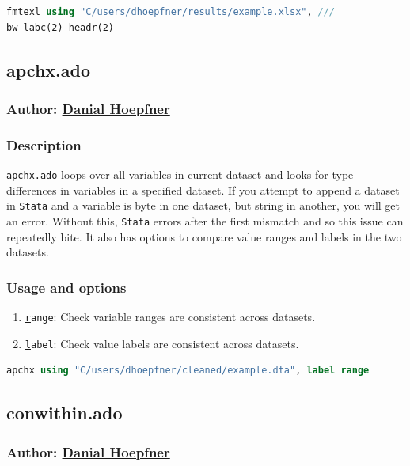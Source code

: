 {\begin{lstlisting}[language=Stata, numbers=none]
fmtexl using "C/users/dhoepfner/results/example.xlsx", ///
bw labc(2) headr(2)
\end{lstlisting}

\subsection{apchx.ado}
\subsubsection{Author: \href{mailto:dhoepfner@gibsonconsult.com}{Danial Hoepfner}}
\subsubsection{Description}
\texttt{apchx.ado} loops over all variables in current dataset and looks for type differences in variables in a specified dataset. If you attempt to append a dataset in \texttt{Stata} and a variable is byte in one dataset, but string in another, you will get an error. Without this, \texttt{Stata} errors after the first mismatch and so this issue can repeatedly bite. It also has options to compare value ranges and labels in the two datasets.
\subsubsection{Usage and options}
\begin{enumerate}
\item \texttt{\underline{r}ange}: Check variable ranges are consistent across datasets.
\item \texttt{\underline{l}abel}: Check value labels are consistent across datasets.
\end{enumerate}

\begin{lstlisting}[language=Stata, numbers=none]
apchx using "C/users/dhoepfner/cleaned/example.dta", label range
\end{lstlisting}

\subsection{conwithin.ado}
\subsubsection{Author: \href{mailto:dhoepfner@gibsonconsult.com}{Danial Hoepfner}}
}

